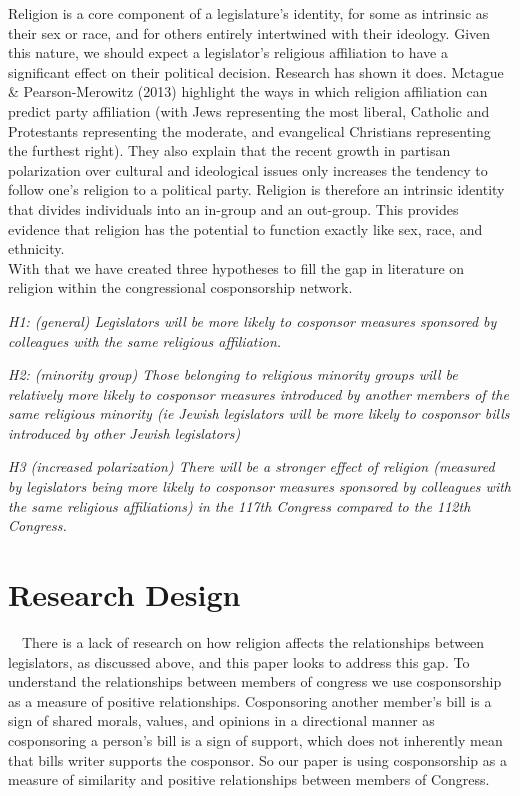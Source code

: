\documentclass[Royal,times,sageh]{sagej}
\begin{document}
Religion is a core component of a legislature's identity, for some as intrinsic as their sex or race, and for others entirely intertwined with their ideology. Given this nature, we should expect a legislator's religious affiliation to have a significant effect on their political decision. Research has shown it does. Mctague \& Pearson-Merowitz (2013) highlight the ways in which religion affiliation can predict party affiliation (with Jews representing the most liberal, Catholic and Protestants representing the moderate, and evangelical Christians representing the furthest right). They also explain that the recent growth in partisan polarization over cultural and ideological issues only increases the tendency to follow one's religion to a political party. Religion is therefore an intrinsic identity that divides individuals into an in-group and an out-group. This provides evidence that religion has the potential to function exactly like sex, race, and ethnicity.\\
With that we have created three hypotheses to fill the gap in literature on religion within the congressional cosponsorship network.

\emph{H1: (general) Legislators will be more likely to cosponsor measures sponsored by colleagues with the same religious affiliation.}

\emph{H2: (minority group) Those belonging to religious minority groups will be relatively more likely to cosponsor measures introduced by another members of the same religious minority (ie Jewish legislators will be more likely to cosponsor bills introduced by other Jewish legislators)}

\emph{H3 (increased polarization) There will be a stronger effect of religion (measured by legislators being more likely to cosponsor measures sponsored by colleagues with the same religious affiliations) in the 117th Congress compared to the 112th Congress. }

\hypertarget{research-design}{%
\section{Research Design}\label{research-design}}

\doublespacing

~~There is a lack of research on how religion affects the relationships between legislators, as discussed above, and this paper looks to address this gap. To understand the relationships between members of congress we use cosponsorship as a measure of positive relationships. Cosponsoring another member's bill is a sign of shared morals, values, and opinions in a directional manner as cosponsoring a person's bill is a sign of support, which does not inherently mean that bills writer supports the cosponsor. So our paper is using cosponsorship as a measure of similarity and positive relationships between members of Congress.
\end{document}
